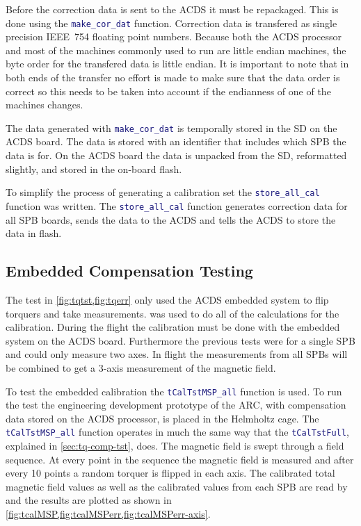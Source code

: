 Before the correction data is sent to the \ac{ACDS} it must be repackaged. This is done using the \lstinline[style=code,language=Matlab]$make_cor_dat$ function. Correction data is transfered as single precision IEEE~754 floating point numbers. Because both the \ac{ACDS} processor and most of the machines commonly used to run \matlab are little endian machines, the byte order for the transfered data is little endian. It is important to note that in both ends of the transfer no effort is made to make sure that the data order is correct so this needs to be taken into account if the endianness of one of the machines changes.

The data generated with \lstinline[style=code,language=Matlab]$make_cor_dat$ is temporally stored in the \ac{SD} on the \ac{ACDS} board. The data is stored with an identifier that includes which \ac{SPB} the data is for. On the \ac{ACDS} board the data is unpacked from the \ac{SD}, reformatted slightly, and stored in the on-board flash. 

To simplify the process of generating a calibration set the \lstinline[style=code,language=Matlab]$store_all_cal$ function was written. The \lstinline[style=code,language=Matlab]$store_all_cal$ function generates correction data for all \ac{SPB} boards, sends the data to the \ac{ACDS} and tells the \ac{ACDS} to store the data in flash. 

\subsection{Embedded Compensation Testing}

The test in \cref{fig:tqtst,fig:tqerr} only used the \ac{ACDS} embedded system to flip torquers and take measurements. \matlab was used to do all of the calculations for the calibration. During the flight the calibration must be done with the embedded system on the \ac{ACDS} board. Furthermore the previous tests were for a single \ac{SPB} and could only measure two axes. In flight the measurements from all \acp{SPB} will be combined to get a 3-axis measurement of the magnetic field.

To test the embedded calibration the \lstinline[style=code,language=Matlab]$tCalTstMSP_all$ function is used. To run the test the engineering development prototype of the \ac{ARC}, with compensation data stored on the \ac{ACDS} processor, is placed in the Helmholtz cage. The \lstinline[style=code,language=Matlab]$tCalTstMSP_all$ function operates in much the same way that the \lstinline[style=code,language=Matlab]$tCalTstFull$, explained in \cref{sec:tq-comp-tst}, does. The magnetic field is swept through a field sequence. At every point in the sequence the magnetic field is measured and after every 10 points a random torquer is flipped in each axis. The calibrated total magnetic field values as well as the calibrated values from each \ac{SPB} are read by \matlab and the results are plotted as shown in \cref{fig:tcalMSP,fig:tcalMSPerr,fig:tcalMSPerr-axis}.


